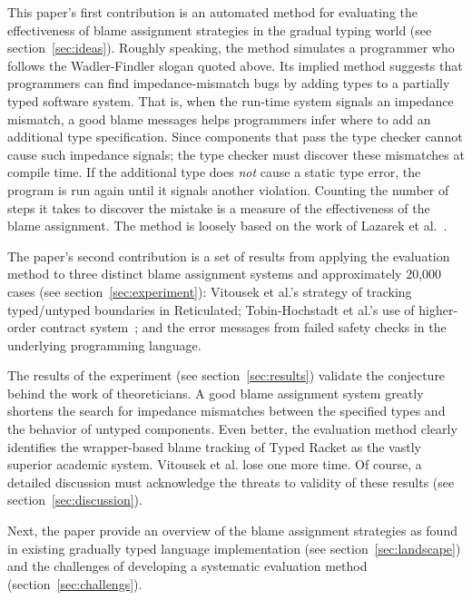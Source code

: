 This paper's first contribution is an automated method for evaluating the
effectiveness of blame assignment strategies in the gradual typing world (see
section~\ref{sec:ideas}). Roughly speaking, the method simulates a programmer who
follows the Wadler-Findler slogan quoted above. Its implied method suggests that
programmers can find impedance-mismatch bugs by adding types to a partially typed
software system. That is, when the run-time system signals an impedance mismatch,
a good blame messages helps programmers infer where to add an additional type
specification. Since components that pass the type checker cannot cause such
impedance signals; the type checker must discover these mismatches at compile
time.  If the additional type does {\em not\/} cause a static type error, the
program is run again until it signals another violation.  Counting the number of
steps it takes to discover the mistake is a measure of the effectiveness of the
blame assignment.  The method is loosely based on the work of Lazarek et
al.~\cite{lksfd-popl-2020}. 

The paper's second contribution is a set of results from applying the evaluation
method to three distinct blame assignment systems and approximately 20,000
cases (see section~\ref{sec:experiment}): Vitousek et
al.'s strategy of tracking typed/untyped boundaries in Reticulated;
Tobin-Hochstadt et al.'s use of higher-order contract system~\cite{ff-icfp-2002,
mf-toplas-2009}; and the error messages from failed safety checks in the
underlying programming language.


The results of the experiment (see section~\ref{sec:results}) validate the
conjecture behind the work of theoreticians. A good blame assignment system
greatly shortens the search for impedance mismatches between the specified types
and the behavior of untyped components. Even better, the evaluation method clearly
identifies the wrapper-based blame tracking of Typed Racket as the vastly superior
academic system. Vitousek et al. lose one more time. Of course, a detailed
discussion must acknowledge the threats to validity of these results (see
section~\ref{sec:discussion}).

Next, the paper provide an overview of the blame assignment strategies as found in
existing gradually typed language implementation (see section~\ref{sec:landscape})
and the challenges of developing a systematic evaluation method
(section~\ref{sec:challengs}).

